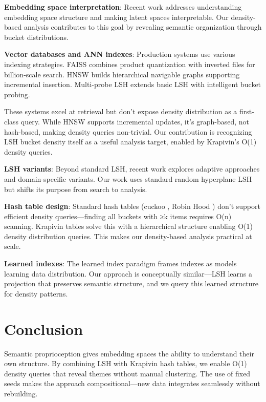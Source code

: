 \documentclass[
]{article}
\begin{document}
\textbf{Embedding space interpretation}: Recent work
\autocite{singh2023demystifying,kim2022interpreting} addresses
understanding embedding space structure and making latent spaces
interpretable. Our density-based analysis contributes to this goal by
revealing semantic organization through bucket distributions.

\textbf{Vector databases and ANN indexes}: Production systems use
various indexing strategies. FAISS \autocite{johnson2019faiss} combines
product quantization \autocite{jegou2011product} with inverted files for
billion-scale search. HNSW \autocite{malkov2020hnsw} builds hierarchical
navigable graphs supporting incremental insertion. Multi-probe LSH
\autocite{lv2007multiprobe} extends basic LSH with intelligent bucket
probing.

These systems excel at retrieval but don't expose density distribution
as a first-class query. While HNSW supports incremental updates, it's
graph-based, not hash-based, making density queries non-trivial. Our
contribution is recognizing LSH bucket density itself as a useful
analysis target, enabled by Krapivin's O(1) density queries.

\textbf{LSH variants}: Beyond standard LSH, recent work explores
adaptive approaches \autocite{andoni2015optimal} and domain-specific
variants. Our work uses standard random hyperplane LSH
\autocite{charikar2002simhash} but shifts its purpose from search to
analysis.

\textbf{Hash table design}: Standard hash tables (cuckoo
\autocite{pagh2004cuckoo}, Robin Hood \autocite{celis1986robin}) don't
support efficient density queries---finding all buckets with ≥k items
requires O(n) scanning. Krapivin tables \autocite{krapivin2025optimal}
solve this with a hierarchical structure enabling O(1) density
distribution queries. This makes our density-based analysis practical at
scale.

\textbf{Learned indexes}: The learned index paradigm
\autocite{kraska2018learned} frames indexes as models learning data
distribution. Our approach is conceptually similar---LSH learns a
projection that preserves semantic structure, and we query this learned
structure for density patterns.

\section{Conclusion}\label{conclusion}

Semantic proprioception gives embedding spaces the ability to understand
their own structure. By combining LSH with Krapivin hash tables, we
enable O(1) density queries that reveal themes without manual
clustering. The use of fixed seeds makes the approach
compositional---new data integrates seamlessly without rebuilding.
\end{document}
